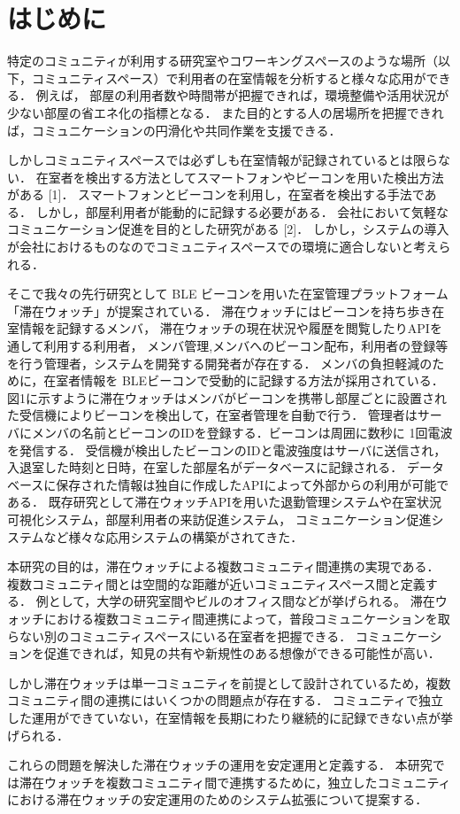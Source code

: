 \thispagestyle{myheadings}


\section{はじめに}
\label{sec:intro}
特定のコミュニティが利用する研究室やコワーキングスペースのような場所（以下，コミュニティスペース）で利用者の在室情報を分析すると様々な応用ができる．
例えば， 部屋の利用者数や時間帯が把握できれば，環境整備や活用状況が少ない部屋の省エネ化の指標となる．
また目的とする人の居場所を把握できれば，コミュニケーションの円滑化や共同作業を支援できる．

しかしコミュニティスペースでは必ずしも在室情報が記録されているとは限らない．
在室者を検出する方法としてスマートフォンやビーコンを用いた検出方法がある [1]．
スマートフォンとビーコンを利用し，在室者を検出する手法である．
しかし，部屋利用者が能動的に記録する必要がある．
会社において気軽なコミュニケーション促進を目的とした研究がある [2]．
しかし，システムの導入が会社におけるものなのでコミュニティスペースでの環境に適合しないと考えられる．

そこで我々の先行研究として BLE ビーコンを用いた在室管理プラットフォーム「滞在ウォッチ」が提案されている．
滞在ウォッチにはビーコンを持ち歩き在室情報を記録するメンバ，
滞在ウォッチの現在状況や履歴を閲覧したりAPIを通して利用する利用者，
メンバ管理,メンバへのビーコン配布，利用者の登録等を行う管理者，システムを開発する開発者が存在する．
メンバの負担軽減のために，在室者情報を BLEビーコンで受動的に記録する方法が採用されている．
図1に示すように滞在ウォッチはメンバがビーコンを携帯し部屋ごとに設置された受信機によりビーコンを検出して，在室者管理を自動で行う．
管理者はサーバにメンバの名前とビーコンのIDを登録する．ビーコンは周囲に数秒に 1回電波を発信する．
受信機が検出したビーコンのIDと電波強度はサーバに送信され，入退室した時刻と日時，在室した部屋名がデータベースに記録される．
データベースに保存された情報は独自に作成したAPIによって外部からの利用が可能である．
既存研究として滞在ウォッチAPIを用いた退勤管理システムや在室状況可視化システム，部屋利用者の来訪促進システム，
コミュニケーション促進システムなど様々な応用システムの構築がされてきた．

本研究の目的は，滞在ウォッチによる複数コミュニティ間連携の実現である．
複数コミュニティ間とは空間的な距離が近いコミュニティスペース間と定義する．
例として，大学の研究室間やビルのオフィス間などが挙げられる。
滞在ウォッチにおける複数コミュニティ間連携によって，普段コミュニケーションを取らない別のコミュニティスペースにいる在室者を把握できる．
コミュニケーションを促進できれば，知見の共有や新規性のある想像ができる可能性が高い．

しかし滞在ウォッチは単一コミュニティを前提として設計されているため，複数コミュニティ間の連携にはいくつかの問題点が存在する．
コミュニティで独立した運用ができていない，在室情報を長期にわたり継続的に記録できない点が挙げられる．


これらの問題を解決した滞在ウォッチの運用を安定運用と定義する．
本研究では滞在ウォッチを複数コミュニティ間で連携するために，独立したコミュニティにおける滞在ウォッチの安定運用のためのシステム拡張について提案する．